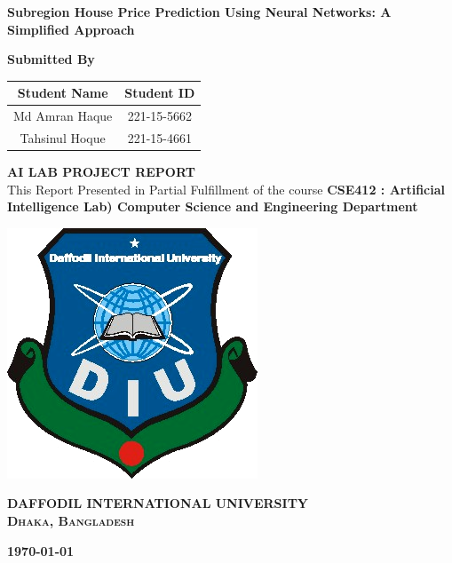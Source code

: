 \begin{titlepage}

\vspace*{2cm} %

\begin{center}
{\huge\bf Subregion House Price Prediction Using Neural Networks: A Simplified Approach}
\end{center}

\vspace{2cm}

\begin{center}
\Large \bf Submitted By
\end{center}

\vspace{.1cm}

\begin{table}[h!]
\centering
\begin{tabular}{|c|c|}
\hline
\textbf{      Student Name      } & \textbf{  Student ID  } \\
\hline
Md Amran Haque   & 221-15-5662 \\
\hline
Tahsinul Hoque &  221-15-4661 \\
\hline
\end{tabular}
\end{table}

\vspace{2cm}

\begin{center}
{\Large\bf AI LAB PROJECT REPORT}\\
\vspace{0.2cm}
\Large This Report Presented in Partial Fulfillment of the course  \textbf{CSE412 : Artificial Intelligence  Lab)
 Computer Science and Engineering Department}
\end{center}

\vspace{2cm}

\begin{center}
\includegraphics[scale=0.5]{./figures/DIU Logo}
\end{center}

\begin{center}
	\Large\textbf{DAFFODIL INTERNATIONAL UNIVERSITY}\\
 \textbf{\textsc{Dhaka, Bangladesh}}
\end{center}

\begin{center}
\textbf{\today}
\end{center}

\end{titlepage}

